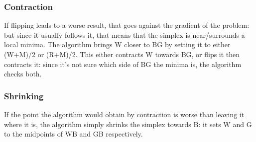 \subsubsection{Contraction}
If flipping leads to a worse result, that goes against the gradient of the problem: but since it usually follows it, that means that the simplex is near/surrounds a local minima. The algorithm brings W closer to BG by setting it to either (W+M)/2 or (R+M)/2. This either contracts W towards BG, or flips it then contracts it: since it's not sure which side of BG the minima is, the algorithm checks both.

\subsubsection{Shrinking}
If the point the algorithm would obtain by contraction is worse than leaving it where it is, the algorithm simply shrinks the simplex towards B: it sets W and G to the midpoints of WB and GB respectively.

